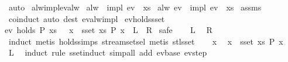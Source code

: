 \begin{isabellebody}
\ auto\isanewline
{}\isamarkupfalse%
%
\endisatagproof
{\isafoldproof}%
%
\isadelimproof
\isanewline
%
\endisadelimproof
\isanewline
{}\isamarkupfalse%
\ alw{\isacharunderscore}impl{\isacharunderscore}ev{\isacharunderscore}alw{\isacharcolon}\isanewline
{}\ {\isachardoublequoteopen}alw\ {\isacharparenleft}{\isasymphi}\ impl\ ev\ {\isasympsi}{\isacharparenright}\ xs{\isachardoublequoteclose}\isanewline
{}\ {\isachardoublequoteopen}alw\ {\isacharparenleft}ev\ {\isasymphi}\ impl\ ev\ {\isasympsi}{\isacharparenright}\ xs{\isachardoublequoteclose}\isanewline
%
\isadelimproof
%
\endisadelimproof
%
\isatagproof
{}\isamarkupfalse%
\ assms\ \isamarkupfalse%
\ coinduct\ {\isacharparenleft}auto\ dest{\isacharcolon}\ ev{\isacharunderscore}alw{\isacharunderscore}impl{\isacharparenright}%
\endisatagproof
{\isafoldproof}%
%
\isadelimproof
\isanewline
%
\endisadelimproof
\isanewline
{}\isamarkupfalse%
\ ev{\isacharunderscore}holds{\isacharunderscore}sset{\isacharcolon}\isanewline
{\isachardoublequoteopen}ev\ {\isacharparenleft}holds\ P{\isacharparenright}\ xs\ {\isasymlongleftrightarrow}\ {\isacharparenleft}{\isasymexists}\ x\ {\isasymin}\ sset\ xs{\isachardot}\ P\ x{\isacharparenright}{\isachardoublequoteclose}\ {\isacharparenleft}\ {\isachardoublequoteopen}{\isacharquery}L\ {\isasymlongleftrightarrow}\ {\isacharquery}R{\isachardoublequoteclose}{\isacharparenright}\isanewline
%
\isadelimproof
%
\endisadelimproof
%
\isatagproof
{}\isamarkupfalse%
\ safe\isanewline
\ \ \isamarkupfalse%
\ {\isacharquery}L\ \isamarkupfalse%
\ {\isacharquery}R\ \isamarkupfalse%
\ induct\ {\isacharparenleft}metis\ holds{\isachardot}simps\ stream{\isachardot}set{\isacharunderscore}sel{\isacharparenleft}{}{\isacharparenright}{\isacharcomma}\ metis\ stl{\isacharunderscore}sset{\isacharparenright}\isanewline
{}\isamarkupfalse%
\isanewline
\ \ \isamarkupfalse%
\ x\ \isamarkupfalse%
\ {\isachardoublequoteopen}x\ {\isasymin}\ sset\ xs{\isachardoublequoteclose}\ {\isachardoublequoteopen}P\ x{\isachardoublequoteclose}\isanewline
\ \ \isamarkupfalse%
\ {\isacharquery}L\ \isamarkupfalse%
\ {\isacharparenleft}induct\ rule{\isacharcolon}\ sset{\isacharunderscore}induct{\isacharparenright}\ {\isacharparenleft}simp{\isacharunderscore}all\ add{\isacharcolon}\ ev{\isachardot}base\ ev{\isachardot}step{\isacharparenright}\isanewline

\end{isabellebody}
